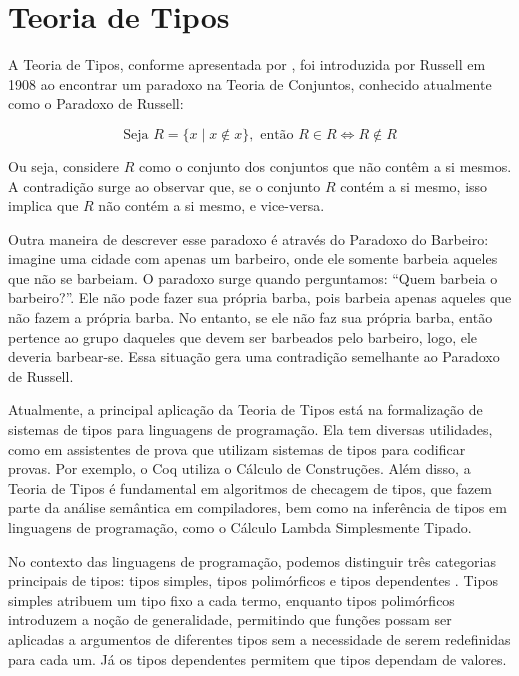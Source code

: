 \chapter{Teoria de Tipos} \label{ch:type-theory}

A Teoria de Tipos, conforme apresentada por \cite{COQUAND2022}, foi introduzida por Russell em 1908 ao encontrar um paradoxo na Teoria de Conjuntos, conhecido atualmente como o Paradoxo de Russell:

\begin{equation} \label{eq:russell-paradox}
  \text{Seja } R = \{ x \mid x \notin x \}, \text{ então } R \in R \iff R \notin R
\end{equation}

Ou seja, considere $R$ como o conjunto dos conjuntos que não contêm a si mesmos.
A contradição surge ao observar que, se o conjunto $R$ contém a si mesmo, isso implica que $R$ não contém a si mesmo, e vice-versa.

Outra maneira de descrever esse paradoxo é através do Paradoxo do Barbeiro: imagine uma cidade com apenas um barbeiro, onde ele somente barbeia aqueles que não se barbeiam.
O paradoxo surge quando perguntamos: ``Quem barbeia o barbeiro?''.
Ele não pode fazer sua própria barba, pois barbeia apenas aqueles que não fazem a própria barba.
No entanto, se ele não faz sua própria barba, então pertence ao grupo daqueles que devem ser barbeados pelo barbeiro, logo, ele deveria barbear-se.
Essa situação gera uma contradição semelhante ao Paradoxo de Russell.

Atualmente, a principal aplicação da Teoria de Tipos está na formalização de sistemas de tipos para linguagens de programação.
Ela tem diversas utilidades, como em assistentes de prova que utilizam sistemas de tipos para codificar provas.
Por exemplo, o Coq \cite{COQUAND1998} utiliza o Cálculo de Construções.
Além disso, a Teoria de Tipos é fundamental em algoritmos de checagem de tipos, que fazem parte da análise semântica em compiladores, bem como na inferência de tipos em linguagens de programação, como o Cálculo Lambda Simplesmente Tipado.


No contexto das linguagens de programação, podemos distinguir três categorias principais de tipos: tipos simples, tipos polimórficos e tipos dependentes \cite{PIERCE2002}.
Tipos simples atribuem um tipo fixo a cada termo, enquanto tipos polimórficos introduzem a noção de generalidade, permitindo que funções possam ser aplicadas a argumentos de diferentes tipos sem a necessidade de serem redefinidas para cada um.
Já os tipos dependentes permitem que tipos dependam de valores.


